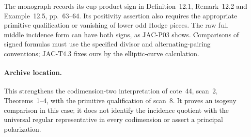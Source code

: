 The monograph records its cup-product sign in Definition~12.1,
Remark~12.2 and Example~12.5, pp.~63--64. Its positivity assertion
also requires the appropriate primitive qualification or vanishing
of lower odd Hodge pieces. The raw full middle incidence form can
have both signs, as JAC-P03 shows. Comparisons of signed formulas
must use the specified divisor and alternating-pairing conventions;
JAC-T4.3 fixes ours by the elliptic-curve calculation.

\paragraph{Archive location.}
This strengthens the codimension-two interpretation of cote~44,
scan~2, Theorems~1--4, with the primitive qualification of scan~8.
It proves an isogeny comparison in this case; it does not identify
the incidence quotient with the universal regular representative in
every codimension or assert a principal polarization.
